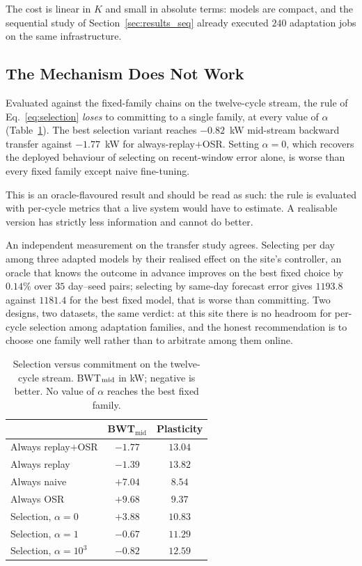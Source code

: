 \documentclass[journal]{IEEEtran}
\begin{document}
The cost is linear in $K$ and small in absolute terms: models are compact, and
the sequential study of Section~\ref{sec:results_seq} already executed $240$
adaptation jobs on the same infrastructure.

\subsection{The Mechanism Does Not Work}
\label{sec:selection_fails}
Evaluated against the fixed-family chains on the twelve-cycle stream, the rule
of Eq.~\eqref{eq:selection} \emph{loses} to committing to a single family, at
every value of $\alpha$ (Table~\ref{tab:selection}). The best selection variant
reaches $-0.82$~kW mid-stream backward transfer against $-1.77$~kW for
always-replay${+}$OSR. Setting $\alpha{=}0$, which recovers the deployed
behaviour of selecting on recent-window error alone, is worse than every fixed
family except naive fine-tuning.

This is an oracle-flavoured result and should be read as such: the rule is
evaluated with per-cycle metrics that a live system would have to estimate.
A realisable version has strictly less information and cannot do better.

An independent measurement on the transfer study agrees. Selecting per day
among three adapted models by their realised effect on the site's controller,
an oracle that knows the outcome in advance improves on the best fixed choice
by $0.14\%$ over $35$ day--seed pairs; selecting by same-day forecast error
gives $1193.8$ against $1181.4$ for the best fixed model, that is worse than
committing. Two designs, two datasets, the same verdict: at this site there is
no headroom for per-cycle selection among adaptation families, and the honest
recommendation is to choose one family well rather than to arbitrate among them
online.

\begin{table}[t]
\centering
\caption{Selection versus commitment on the twelve-cycle stream. BWT$_{\rm mid}$
in kW; negative is better. No value of $\alpha$ reaches the best fixed family.}
\label{tab:selection}
\begin{tabular}{@{}lcc@{}}
\toprule
& BWT$_{\mathrm{mid}}$ & Plasticity \\
\midrule
Always replay${+}$OSR & $\mathbf{-1.77}$ & $13.04$ \\
Always replay & $-1.39$ & $13.82$ \\
Always naive & $+7.04$ & $8.54$ \\
Always OSR & $+9.68$ & $9.37$ \\
\midrule
Selection, $\alpha{=}0$ & $+3.88$ & $10.83$ \\
Selection, $\alpha{=}1$ & $-0.67$ & $11.29$ \\
Selection, $\alpha{=}10^3$ & $-0.82$ & $12.59$ \\
\bottomrule
\end{tabular}
\end{table}
\end{document}
